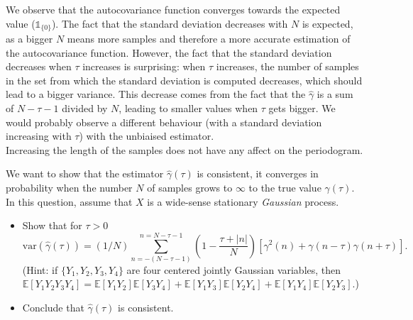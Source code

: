 \documentclass[11pt]{article}
\begin{document}
\begin{solution}

    We observe that the autocovariance function converges towards the expected value ($\mathbb{1}_{\{0\}}$). 
    The fact that the standard deviation decreases with $N$ is expected, as a bigger $N$ means more samples and therefore a more accurate estimation of the autocovariance function.
    However, the fact that the standard deviation decreases when $\tau$ increases is surprising: when $\tau$ increases, the number of samples in the set from which the standard deviation is computed decreases, which should lead to a bigger variance. 
    This decrease comes from the fact that the $\hat{\gamma}$ is a sum of $N-\tau -1$ divided by $N$, leading to smaller values when $\tau$ gets bigger. 
    We would probably observe a different behaviour (with a standard deviation increasing with $\tau$) with the unbiaised estimator.\\

    Increasing the length of the samples does not have any affect on the periodogram. 
\end{solution}

\begin{exercise}
    We want to show that the estimator $\hat{\gamma}(\tau)$ is consistent, \ie it converges in probability when the number $N$ of samples grows to $\infty$ to the true value ${\gamma}(\tau)$.
    In this question, assume that $X$ is a wide-sense stationary \textit{Gaussian} process.
    \begin{itemize}
        \item Show that for $\tau>0$ 
    \begin{equation}
       \text{var}(\hat{\gamma}(\tau)) = (1/N) \sum_{n=-(N-\tau-1)}^{n=N-\tau-1} \left(1 - \frac{\tau + |n|}{N}\right) \left[\gamma^2(n) + \gamma(n-\tau)\gamma(n+\tau)\right].
    \end{equation}
    (Hint: if $\{Y_1, Y_2, Y_3, Y_4\}$ are four centered jointly Gaussian variables, then $\mathbb{E}[Y_1 Y_2 Y_3 Y_4] = \mathbb{E}[Y_1 Y_2]\mathbb{E}[Y_3 Y_4] + \mathbb{E}[Y_1 Y_3]\mathbb{E}[Y_2 Y_4] + \mathbb{E}[Y_1 Y_4]\mathbb{E}[Y_2 Y_3]$.) 
    \item Conclude that $\hat{\gamma}(\tau)$ is consistent.
    \end{itemize}
\end{exercise}
\end{document}
